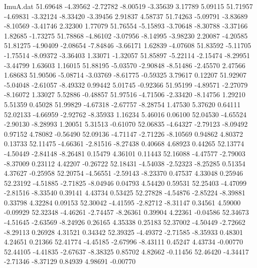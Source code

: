 \begin{filecontents}{ImuA.dat}
  51.69648   -4.39562   -2.72782   -8.00519   -3.35639    3.17789    5.09115
  51.71957   -4.69831   -3.32124   -8.33420   -3.39456    2.91837    4.58737
  51.74263   -5.09791   -3.83689   -8.10569   -3.41746    2.32300    1.77079
  51.76554   -5.15893   -3.70648   -8.30788   -3.37166    1.82685   -1.73275
  51.78868   -4.86102   -3.07956   -8.14995   -3.98230    2.20087   -4.20585
  51.81275   -4.90409   -2.08654   -7.84846   -3.66171    1.62839   -4.07608
  51.83592   -5.11705   -1.75514   -8.09372   -3.36403    1.33071   -1.32057
  51.85897   -5.22114   -2.15474   -8.29951   -3.44799    1.63603    1.16015
  51.88195   -5.03570   -2.90848   -8.51486   -2.45570    2.47566    1.68683
  51.90506   -5.08714   -3.03769   -8.61775   -0.59325    3.79617    0.12207
  51.92907   -5.04048   -2.61057   -8.49332    0.99442    5.01745   -0.92366
  51.95199   -4.89571   -2.27079   -8.16072    1.33027    5.52886   -0.48857
  51.97516   -4.71506   -2.33420   -8.14756    1.29210    5.51359    0.45028
  51.99829   -4.67318   -2.67757   -8.28754    1.47530    5.37620    0.64111
  52.02133   -4.66959   -2.92762   -8.35933    1.16234    5.46016    0.06100
  52.04530   -4.65524   -2.90130   -8.28993    1.20051    5.31513   -0.61070
  52.06835   -4.64327   -2.79123   -8.09492    0.97152    4.78082   -0.56490
  52.09136   -4.71147   -2.71226   -8.10569    0.94862    4.80372    0.13733
  52.11475   -4.66361   -2.81516   -8.27438    0.40668    4.68923    0.44265
  52.13774   -4.50449   -2.84148   -8.26481    0.15479    4.36101    0.11443
  52.16088   -4.47577   -2.79003   -8.37009    0.23112    4.42207   -0.26722
  52.18431   -4.54038   -2.52323   -8.25285    0.51354    4.37627   -0.25958
  52.20754   -4.56551   -2.59143   -8.23370    0.47537    4.33048    0.25946
  52.23192   -4.51885   -2.71825   -8.04946    0.04793    4.54420    0.59531
  52.25403   -4.47099   -2.81516   -8.33540    0.39141    4.43734    0.53425
  52.27828   -4.54876   -2.85224   -8.39881    0.33798    4.32284    0.09153
  52.30042   -4.41595   -2.82712   -8.31147    0.34561    4.59000   -0.09929
  52.32348   -4.46261   -2.74457   -8.26361    0.39904    4.22361   -0.04586
  52.34673   -4.51645   -2.63569   -8.24926    0.26165    4.35338    0.25183
  52.37002   -4.50449   -2.72662   -8.29113    0.26928    4.31521    0.34342
  52.39325   -4.49372   -2.71585   -8.35933    0.48301    4.24651    0.21366
  52.41774   -4.45185   -2.67996   -8.43111    0.45247    4.43734   -0.00770
  52.44105   -4.41835   -2.67637   -8.38325    0.85702    4.82662   -0.11456
  52.46420   -4.34417   -2.71346   -8.37129    0.84939    4.98691   -0.00770

\end{filecontents}
